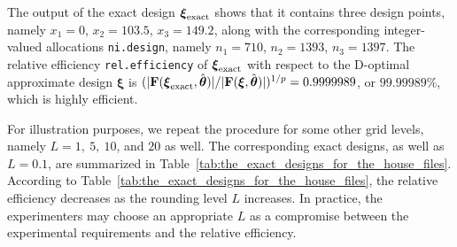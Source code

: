 The output of the exact design $\boldsymbol{\xi}_{\rm exact}$ shows that it contains three design points, namely $x_1=0$, $x_2=103.5$, $x_3=149.2$, along with the corresponding integer-valued allocations {\tt ni.design}, namely $n_1=710$, $n_2=1393$,  $n_3=1397$. The relative efficiency \verb|rel.efficiency| of $\boldsymbol{\xi}_{\rm exact}$ with respect to the D-optimal approximate design $\boldsymbol{\xi}$ is $(|{\mathbf F}(\boldsymbol{\xi}_{\rm exact}, \hat{\boldsymbol\theta})|/|{\mathbf F}(\boldsymbol{\xi}, \hat{\boldsymbol\theta})|)^{1/p} = 0.9999989$, or $99.99989\%$, which is highly efficient. 

For illustration purposes, we repeat the procedure for some other grid levels, namely $L=1, \ 5, \ 10$, and $20$ as well. The corresponding exact designs, as well as $L=0.1$, are summarized in Table~\ref{tab:the_exact_designs_for_the_house_files}.
According to Table~\ref{tab:the_exact_designs_for_the_house_files}, the relative efficiency decreases as the rounding level $L$ increases. In practice, the experimenters may choose an appropriate $L$ as a compromise between the experimental requirements and the relative efficiency. 

\begin{table}[htb]
    \centering
    \caption{Exact designs for house files experiment with different rounding levels and $N=3,500$}
    \label{tab:the_exact_designs_for_the_house_files}
\end{table}

